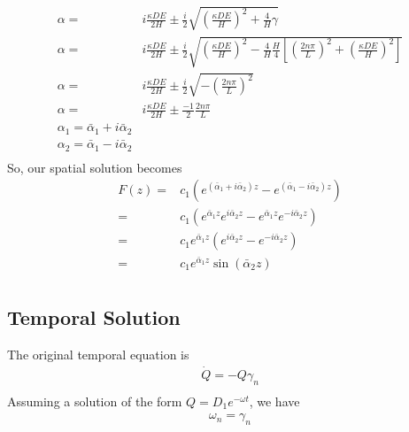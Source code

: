 \documentclass[11pt]{article}
\begin{document}
\begin{equation}\begin{aligned}
	\alpha = & i \frac{\kappa DE}{2H} \pm \frac{i}{2} \sqrt{\left(\frac{\kappa DE}{H}\right)^2 + \frac{4}{H} \gamma} \\
	\alpha = & i \frac{\kappa DE}{2H} \pm \frac{i}{2} \sqrt{\left(\frac{\kappa DE}{H}\right)^2 - \frac{4}{H} \frac{H}{4} \left[ \left( \frac{2n\pi}{L} \right)^2 + \left(\frac{\kappa DE}{H}\right)^2 \right]} \\
	\alpha = & i \frac{\kappa DE}{2H} \pm \frac{i}{2} \sqrt{-\left( \frac{2n\pi}{L} \right)^2} \\
	\alpha = & i \frac{\kappa DE}{2H} \pm \frac{-1}{2} \frac{2n\pi}{L} \\
	\alpha_1 = \bar{\alpha}_1 + i \bar{\alpha}_2 \\
	\alpha_2 = \bar{\alpha}_1 - i \bar{\alpha}_2 \\
\end{aligned} \end{equation}
So, our spatial solution becomes
\begin{equation}\begin{aligned}
	F(z) = & c_1 (e^{(\bar{\alpha}_1 + i \bar{\alpha}_2) z} - e^{(\bar{\alpha}_1 - i \bar{\alpha}_2) z}) \\
	     = & c_1 (e^{\bar{\alpha}_1 z}e^{i \bar{\alpha}_2 z} - e^{\bar{\alpha}_1 z}e^{-i \bar{\alpha}_2 z}) \\
	     = & c_1 e^{\bar{\alpha}_1 z} (e^{i \bar{\alpha}_2 z} - e^{-i \bar{\alpha}_2 z}) \\
	     = & c_1 e^{\bar{\alpha}_1 z} \sin(\bar{\alpha}_2 z) \\
\end{aligned} \end{equation}

\subsection{Temporal Solution}
The original temporal equation is
\begin{equation}\begin{aligned}
\dot{Q} = -Q \gamma_n \\
\end{aligned} \end{equation}
Assuming a solution of the form $Q = D_1 e^{-\omega t}$, we have
\begin{equation}\begin{aligned}
\omega_n = \gamma_n \\
\end{aligned} \end{equation}
\end{document}
